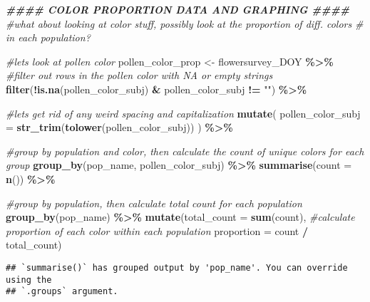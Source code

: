 \documentclass[
]{article}
\newenvironment{Shaded}{\begin{snugshade}}{\end{snugshade}}
\newcommand{\AttributeTok}[1]{\textcolor[rgb]{0.13,0.29,0.53}{#1}}
\newcommand{\CommentTok}[1]{\textcolor[rgb]{0.56,0.35,0.01}{\textit{#1}}}
\newcommand{\DocumentationTok}[1]{\textcolor[rgb]{0.56,0.35,0.01}{\textbf{\textit{#1}}}}
\newcommand{\FunctionTok}[1]{\textcolor[rgb]{0.13,0.29,0.53}{\textbf{#1}}}
\newcommand{\NormalTok}[1]{#1}
\newcommand{\OtherTok}[1]{\textcolor[rgb]{0.56,0.35,0.01}{#1}}
\newcommand{\SpecialCharTok}[1]{\textcolor[rgb]{0.81,0.36,0.00}{\textbf{#1}}}
\newcommand{\StringTok}[1]{\textcolor[rgb]{0.31,0.60,0.02}{#1}}
\begin{document}
\begin{Shaded}
\begin{Highlighting}[]
\DocumentationTok{\#\#\#\# COLOR PROPORTION DATA AND GRAPHING \#\#\#\#}
\CommentTok{\#what about looking at color stuff, possibly look at the proportion of diff. colors}
\CommentTok{\# in each population?}

\CommentTok{\#let\textquotesingle{}s look at pollen color}
\NormalTok{pollen\_color\_prop }\OtherTok{\textless{}{-}}\NormalTok{ flowersurvey\_DOY }\SpecialCharTok{\%\textgreater{}\%}
  \CommentTok{\#filter out rows in the pollen color with NA or empty strings}
  \FunctionTok{filter}\NormalTok{(}\SpecialCharTok{!}\FunctionTok{is.na}\NormalTok{(pollen\_color\_subj) }\SpecialCharTok{\&}\NormalTok{ pollen\_color\_subj }\SpecialCharTok{!=} \StringTok{""}\NormalTok{) }\SpecialCharTok{\%\textgreater{}\%}

    \CommentTok{\#let\textquotesingle{}s get rid of any weird spacing and capitalization}
  \FunctionTok{mutate}\NormalTok{(}
    \AttributeTok{pollen\_color\_subj =} \FunctionTok{str\_trim}\NormalTok{(}\FunctionTok{tolower}\NormalTok{(pollen\_color\_subj))}
\NormalTok{  ) }\SpecialCharTok{\%\textgreater{}\%}
  
  \CommentTok{\#group by population and color, then calculate the count of unique colors for each group}
  \FunctionTok{group\_by}\NormalTok{(pop\_name, pollen\_color\_subj) }\SpecialCharTok{\%\textgreater{}\%}
  \FunctionTok{summarise}\NormalTok{(}\AttributeTok{count =} \FunctionTok{n}\NormalTok{()) }\SpecialCharTok{\%\textgreater{}\%}
  
  \CommentTok{\#group by population, then calculate total count for each population}
  \FunctionTok{group\_by}\NormalTok{(pop\_name) }\SpecialCharTok{\%\textgreater{}\%}
  \FunctionTok{mutate}\NormalTok{(}\AttributeTok{total\_count =} \FunctionTok{sum}\NormalTok{(count),}
         \CommentTok{\#calculate proportion of each color within each population}
         \AttributeTok{proportion =}\NormalTok{ count }\SpecialCharTok{/}\NormalTok{ total\_count)}
\end{Highlighting}
\end{Shaded}

\begin{verbatim}
## `summarise()` has grouped output by 'pop_name'. You can override using the
## `.groups` argument.
\end{verbatim}
\end{document}
